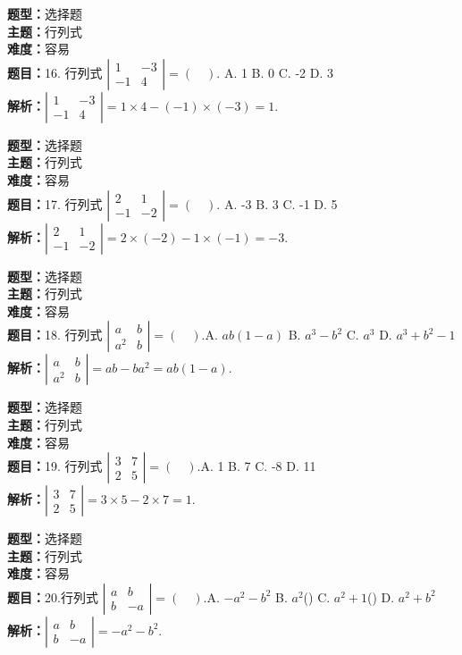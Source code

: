 \documentclass{ctexart}
\newenvironment{question}[5]{%
	\noindent\textbf{题型：}#1\\
	\textbf{主题：}#2\\
	\textbf{难度：}#3\\
	\textbf{题目：}#4\\
	\textbf{解析：}#5\\
	\vspace{1em}
}{}
\begin{document}
\begin{question}
	{选择题}
	{行列式}
	{容易}
	{16. 行列式 $\left|\begin{array}{cc}1 & -3 \\ -1 & 4\end{array}\right|=(\quad). $ A.  1 \quad B.  0 \quad C. -2 \quad D.  3}
	{$\left|\begin{array}{cc}1 & -3 \\ -1 & 4\end{array}\right|=1 \times 4-(-1) \times(-3)=1.$}
\end{question}

\begin{question}
	{选择题}
	{行列式}
	{容易}
	{17. 行列式 $\left|\begin{array}{cc}2 & 1 \\ -1 & -2\end{array}\right|=(\quad). $ A. -3 \quad B.  3 \quad C. -1 \quad D.  5}
	{$\left|\begin{array}{cc}2 & 1 \\ -1 & -2\end{array}\right|=2 \times(-2)-1 \times(-1)=-3.$}
\end{question}

\begin{question}
	{选择题}
	{行列式}
	{容易}
	{18. 行列式 $\left|\begin{array}{ll}a & b \\ a^2 & b\end{array}\right|=(\quad). $A. $a b(1-a)$ \quad B. $a^3-b^2$ \quad C. $a^3$ \quad D. $a^3+b^2-1$}
	{$\left|\begin{array}{cc}a & b \\ a^2 & b\end{array}\right|=a b-b a^2=a b(1-a).$}
\end{question}


\begin{question}
	{选择题}
	{行列式}
	{容易}
	{19. 行列式 $\left|\begin{array}{ll}3 & 7 \\ 2 & 5\end{array}\right|=(\quad). $A.  1 \quad B.  7 \quad C. -8 \quad D.  11}
	{$\left|\begin{array}{ll}3 & 7 \\ 2 & 5\end{array}\right|=3 \times 5-2 \times 7=1$.}
\end{question}

\begin{question}
	{选择题}
	{行列式}
	{容易}
	{20.行列式 $\left|\begin{array}{cc}a & b \\ b & -a\end{array}\right|=(\quad). 
		$A. $-a^2-b^2$ \quad B. $a^2$(\quad) C. $a^2+1$(\quad) D. $a^2+b^2$}
	{$\left|\begin{array}{cc}a & b \\ b & -a\end{array}\right|=-a^2-b^2. $}
\end{question}
\end{document}
